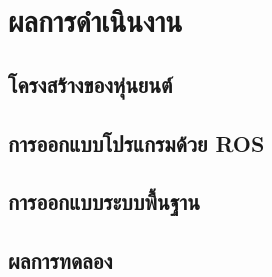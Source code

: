 \chapter{ผลการดำเนินงาน}
\section{โครงสร้างของหุ่นยนต์}


\clearpage
\section{การออกแบบโปรแกรมด้วย ROS}


\clearpage
\section{การออกแบบระบบพื้นฐาน}


\clearpage
\section{ผลการทดลอง}
